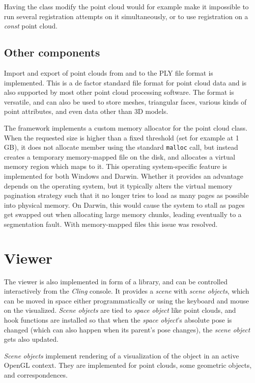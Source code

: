 Having the class modify the point cloud would for example make it impossible to run several registration attempts on it simultaneously, or to use registration on a \emph{const} point cloud.


\subsection{Other components}
Import and export of point clouds from and to the PLY file format is implemented. This is a de factor standard file format for point cloud data and is also supported by most other point cloud processing software. The format is versatile, and can also be used to store meshes, triangular faces, various kinds of point attributes, and even data other than 3D models.

The framework implements a custom memory allocator for the point cloud class. When the requested size is higher than a fixed threshold (set for example at 1 GB), it does not allocate member using the standard \verb&malloc& call, but instead creates a temporary memory-mapped file on the disk, and allocates a virtual memory region which maps to it. This operating system-specific feature is implemented for both Windows and Darwin. Whether it provides an advantage depends on the operating system, but it typically alters the virtual memory pagination strategy such that it no longer tries to load as many pages as possible into physical memory. On Darwin, this would cause the system to stall as pages get swapped out when allocating large memory chunks, leading eventually to a segmentation fault. With memory-mapped files this issue was resolved.


\section{Viewer}
The viewer is also implemented in form of a library, and can be controlled interactively from the \emph{Cling} console. It provides a \emph{scene} with \emph{scene objects}, which can be moved in space either programmatically or using the keyboard and mouse on the visualized. \emph{Scene objects} are tied to \emph{space object} like point clouds, and hook functions are installed so that when the \emph{space object}'s absolute pose is changed (which can also happen when its parent's pose changes), the \emph{scene object} gets also updated.

\emph{Scene objects} implement rendering of a visualization of the object in an active OpenGL context. They are implemented for point clouds, some geometric objects, and correspondences.


